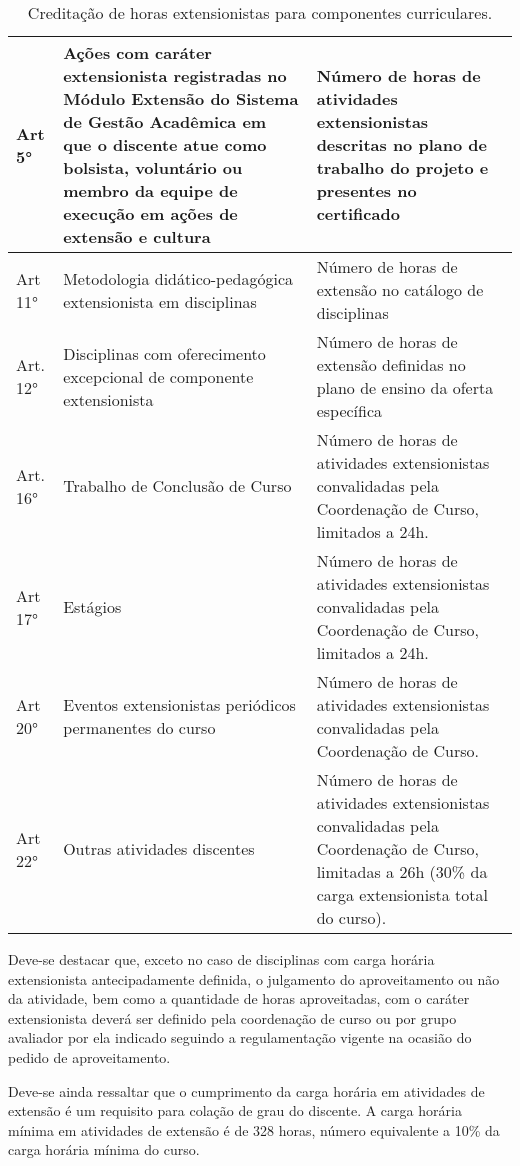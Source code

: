 \begin{table}[h!]
   \caption{Creditação de horas extensionistas para componentes curriculares.}
   \label{tab:componentes-ext}\centering
   \begin{tabular}{|p{}|p{}|p{}|}
      \hline
      Art 5°
      &
        Ações  com caráter  extensionista  registradas no  Módulo Extensão  do
        Sistema  de Gestão  Acadêmica em  que o  discente atue  como bolsista,
        voluntário ou  membro da  equipe de  execução em  ações de  extensão e
        cultura
      &
        Número de horas de atividades extensionistas descritas no plano de
        trabalho do projeto e presentes no certificado
      \\
      \hline
      Art 11°
      &
        Metodologia didático-pedagógica extensionista em disciplinas
      &
        Número de horas de extensão no catálogo de disciplinas
      \\
      \hline
      Art. 12°
      &
        Disciplinas com oferecimento excepcional de componente extensionista
      &
        Número de horas de extensão definidas no plano de ensino da oferta
        específica
     \\
           \hline
      Art. 16°
      &
        Trabalho de Conclusão de Curso
      &
        Número de horas de atividades extensionistas convalidadas pela
        Coordenação de Curso, limitados a 24h.
      \\

      \hline
      Art 17°
      &
        Estágios
      &
        Número de horas de atividades extensionistas convalidadas pela
        Coordenação de Curso, limitados a 24h.
      \\
      \hline
      Art 20°
      &
        Eventos extensionistas periódicos permanentes do curso
      &
        Número  de  horas  de   atividades  extensionistas  convalidadas  pela
        Coordenação de Curso.
      \\
      \hline
      Art 22°
      &
        Outras atividades discentes
      &
        Número de horas de atividades extensionistas convalidadas pela
        Coordenação de Curso, limitadas a 26h (30\% da carga extensionista
        total do curso).
      \\
      \hline
    \end{tabular}
  \end{table}

Deve-se destacar que, exceto no caso de disciplinas com carga horária
extensionista antecipadamente definida, o julgamento do aproveitamento
ou não da atividade, bem como a quantidade de horas aproveitadas, com
o caráter extensionista deverá ser definido pela coordenação de curso
ou por grupo avaliador por ela indicado seguindo a regulamentação
vigente na ocasião do pedido de aproveitamento.

Deve-se ainda ressaltar que o cumprimento da carga horária em
atividades de extensão é um requisito para colação de grau do
discente. A carga horária mínima em atividades de extensão é de 328
horas, número equivalente a 10\% da carga horária mínima do curso.
